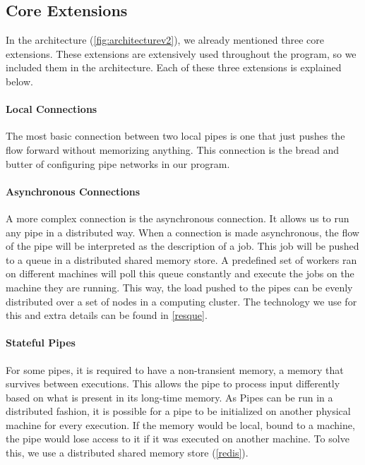 \subsection{Core Extensions}

In the architecture (\autoref{fig:architecturev2}), we already mentioned three core extensions. These extensions are extensively used throughout the program, so we included them in the architecture. Each of these three extensions is explained below.

\paragraph{Local Connections}

The most basic connection between two local pipes is one that just pushes the flow forward without memorizing anything. This connection is the bread and butter of configuring pipe networks in our program.

\paragraph{Asynchronous Connections}

A more complex connection is the asynchronous connection. It allows us to run any pipe in a distributed way. When a connection is made asynchronous, the flow of the pipe will be interpreted as the description of a job. This job will be pushed to a queue in a distributed shared memory store. A predefined set of workers ran on different machines will poll this queue constantly and execute the jobs on the machine they are running. This way, the load pushed to the pipes can be evenly distributed over a set of nodes in a computing cluster. The technology we use for this and extra details can be found in \autoref{resque}.

\paragraph{Stateful Pipes}

For some pipes, it is required to have a non-transient memory, a memory that survives between executions. This allows the pipe to process input differently based on what is present in its long-time memory. As Pipes can be run in a distributed fashion, it is possible for a pipe to be initialized on another physical machine for every execution. If the memory would be local, bound to a machine, the pipe would lose access to it if it was executed on another machine. To solve this, we use a distributed shared memory store (\autoref{redis}).

